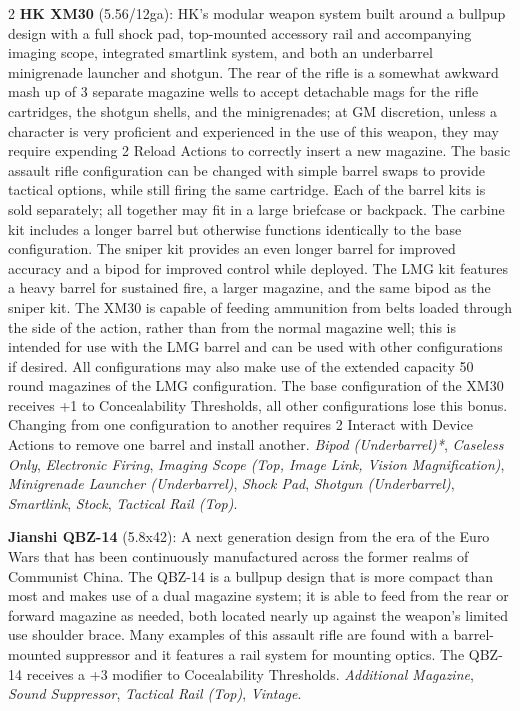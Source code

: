 \documentclass[
  oneside]{article}
\begin{document}
\begin{multicols}{2}
\textbf{HK XM30} (5.56/12ga): HK's modular weapon
system built around a bullpup design with a full
shock pad, top-mounted accessory rail and
accompanying imaging scope, integrated smartlink
system, and both an underbarrel minigrenade
launcher and shotgun. The rear of the rifle is a
somewhat awkward mash up of 3 separate magazine
wells to accept detachable mags for the rifle
cartridges, the shotgun shells, and the
minigrenades; at GM discretion, unless a character
is very proficient and experienced in the use of
this weapon, they may require expending 2 Reload
Actions to correctly insert a new magazine. The
basic assault rifle configuration can be changed
with simple barrel swaps to provide tactical
options, while still firing the same cartridge.
Each of the barrel kits is sold separately; all
together may fit in a large briefcase or backpack.
The carbine kit includes a longer barrel but
otherwise functions identically to the base
configuration. The sniper kit provides an even
longer barrel for improved accuracy and a bipod
for improved control while deployed. The LMG kit
features a heavy barrel for sustained fire, a
larger magazine, and the same bipod as the sniper
kit. The XM30 is capable of feeding ammunition
from belts loaded through the side of the action,
rather than from the normal magazine well; this is
intended for use with the LMG barrel and can be
used with other configurations if desired. All
configurations may also make use of the extended
capacity 50 round magazines of the LMG
configuration. The base configuration of the XM30
receives +1 to Concealability Thresholds, all
other configurations lose this bonus. Changing
from one configuration to another requires 2
Interact with Device Actions to remove one barrel
and install another. \emph{Bipod (Underbarrel)*},
\emph{Caseless Only}, \emph{Electronic Firing},
\emph{Imaging Scope (Top, Image Link, Vision
Magnification)}, \emph{Minigrenade Launcher
(Underbarrel)}, \emph{Shock Pad}, \emph{Shotgun
(Underbarrel)}, \emph{Smartlink}, \emph{Stock},
\emph{Tactical Rail (Top)}.

\textbf{Jianshi QBZ-14} (5.8x42): A next
generation design from the era of the Euro Wars
that has been continuously manufactured across the
former realms of Communist China. The QBZ-14 is a
bullpup design that is more compact than most and
makes use of a dual magazine system; it is able to
feed from the rear or forward magazine as needed,
both located nearly up against the weapon's
limited use shoulder brace. Many examples of this
assault rifle are found with a barrel-mounted
suppressor and it features a rail system for
mounting optics. The QBZ-14 receives a +3 modifier
to Cocealability Thresholds. \emph{Additional
Magazine}, \emph{Sound Suppressor}, \emph{Tactical
Rail (Top)}, \emph{Vintage}.


\end{multicols}
\end{document}

